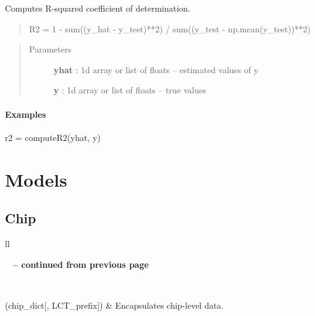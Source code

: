 \documentclass[letterpaper,10pt,english]{sphinxmanual}
\begin{document}
\begin{fulllineitems}
\label{generated/qikify.helpers.computeR2:qikify.helpers.computeR2}
Computes R-squared coefficient of determination.
\begin{quote}

R2 = 1 - sum((y\_hat - y\_test)**2) / sum((y\_test - np.mean(y\_test))**2)
\end{quote}
\begin{quote}\begin{description}
\item[{Parameters }] \leavevmode
\textbf{yhat} : 1d array or list of floats -- estimated values of y

\textbf{y} : 1d array or list of floats -- true values

\end{description}\end{quote}
\paragraph{Examples}

r2 = computeR2(yhat, y)

\end{fulllineitems}



\section{Models}
\label{api:models}

\subsection{Chip}
\label{api:chip}
\begin{longtable}{ll}
\hline
\endfirsthead

%
{{\bfseries \tablename\ \thetable{} -- continued from previous page}} \\
\hline
\endhead

\hline {} \\ \hline
\endfoot

\hline
\endlastfoot


{\hyperref[generated/qikify.models.chip.Chip:qikify.models.chip.Chip]{}}(chip\_dict{[}, LCT\_prefix{]})
 & 
Encapsulates chip-level data.
\\\hline
\end{longtable}
\end{document}
